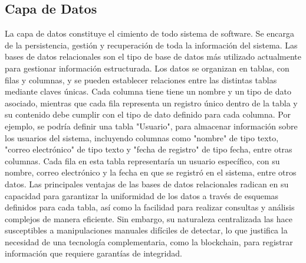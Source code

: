 \subsection{Capa de Datos}

La capa de datos constituye el cimiento de todo sistema de software. Se encarga de la persistencia, gestión y recuperación de toda la información del sistema. Las bases de datos relacionales son el tipo de base de datos más utilizado actualmente para gestionar información estructurada. Los datos se organizan en tablas, con filas y columnas, y se pueden establecer relaciones entre las distintas tablas mediante claves únicas. Cada columna tiene tiene un nombre y un tipo de dato asociado, mientras que cada fila representa un registro único dentro de la tabla y su contenido debe cumplir con el tipo de dato definido para cada columna. Por ejemplo, se podría definir una tabla "Usuario", para almacenar información sobre los usuarios del sistema, incluyendo columnas como "nombre" de tipo texto, "correo electrónico" de tipo texto y "fecha de registro" de tipo fecha, entre otras columnas. Cada fila en esta tabla representaría un usuario específico, con su nombre, correo electrónico y la fecha en que se registró en el sistema, entre otros datos. Las principales ventajas de las bases de datos relacionales radican en su capacidad para garantizar la uniformidad de los datos a través de esquemas definidos para cada tabla, así como la facilidad para realizar consultas y análisis complejos de manera eficiente. Sin embargo, su naturaleza centralizada las hace susceptibles a manipulaciones manuales difíciles de detectar, lo que justifica la necesidad de una tecnología complementaria, como la blockchain, para registrar información que requiere garantías de integridad.

